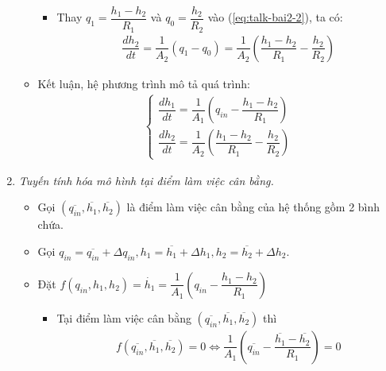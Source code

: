 \documentclass[12pt,a4paper]{article}
\begin{document}
\begin{enumerate}[\it a.]
\begin{itemize}
\begin{itemize}
                            \item Thay $q_1 = \dfrac{h_1 - h_2}{R_1}$ và $q_0 = \dfrac{h_2}{R_2}$ vào (\ref{eq:talk-bai2-2}), ta có:
                                \begin{align} \label{eq:talk-bai2-2-2}
                                    \dfrac{d h_2}{dt} = \dfrac{1}{A_2} \left({q_1 - q_0}\right) = \dfrac{1}{A_2} \left({\dfrac{h_1 - h_2}{R_1} - \dfrac{h_2}{R_2}}\right)
                                \end{align}
                        \end{itemize}

                    \item Kết luận, hệ phương trình mô tả quá trình:
                        \begin{align}
                            \left\{
                            \begin{array}{l}
                                \dfrac{d h_1}{dt} = \dfrac{1}{A_1} \left({q_{in} - \dfrac{h_1 - h_2}{R_1}}\right)\\ [.5cm]
                                \dfrac{d h_2}{dt} = \dfrac{1}{A_2} \left({\dfrac{h_1 - h_2}{R_1} - \dfrac{h_2}{R_2}}\right)
                            \end{array}
                            \right.
                        \end{align}
                \end{itemize}

            \item \textit{Tuyến tính hóa mô hình tại điểm làm việc cân bằng.}
                \begin{itemize}
                    \item Gọi $\left({ \overline{q_{in}}, \overline{h_1}, \overline{h_2}}\right)$ là điểm làm việc cân bằng của hệ thống gồm 2 bình chứa.

                    \item Gọi $q_{in} = \overline{q_{in}} + \Delta q_{in}, h_1 = \overline{h_1} + \Delta h_1, h_2 = \overline{h_2} + \Delta h_2$.

                    \item Đặt $f\left({q_{in}, h_1, h_2}\right) = \dot{h_1} = \dfrac{1}{A_1} \left({q_{in} - \dfrac{h_1 - h_2}{R_1}}\right)$
                        \begin{itemize}
                            \item Tại điểm làm việc cân bằng $\left({ \overline{q_{in}}, \overline{h_1}, \overline{h_2}}\right)$ thì
                                \begin{align}
                                    f\left({ \overline{q_{in}}, \overline{h_1}, \overline{h_2}}\right) = 0 \Longleftrightarrow \dfrac{1}{A_1} \left({\overline{q_{in}} - \dfrac{\overline{h_1} - \overline{h_2}}{R_1}}\right) = 0
                                \end{align}


\end{itemize}
\end{itemize}
\end{enumerate}
\end{document}
